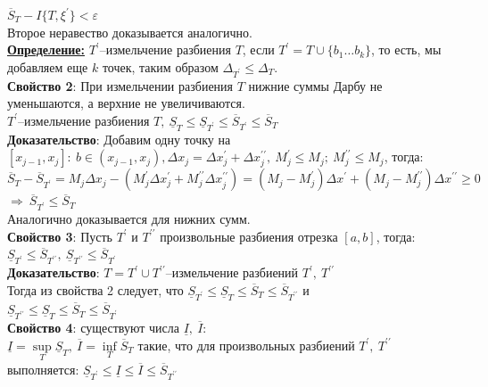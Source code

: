 \documentclass[a4paper,12pt]{article} %
\renewcommand {\geq}{\geqslant}
\renewcommand {\leq}{\leqslant}
\begin{document}
	$\overline{S}_T - I\{T,\xi^{\prime}\}<\varepsilon$ \\
	Второе неравество доказывается аналогично.\\
	
	\underline{\textbf{Определение:}} $T^{\prime}$--измельчение разбиения $T$, если $T^{\prime}=T\cup \{b_1{\dots}b_k\}$, то есть, мы добавляем еще $k$ точек, таким образом $\Delta_{T^{\prime}}\leq \Delta_T$.\\
	
	\textbf{Свойство 2}: При измельчении разбиения $T$ нижние суммы Дарбу не уменьшаются, а верхние не увеличиваются.\\
	$T^{\prime}$--измельчение разбиения $T,~\underline{S}_T\leq \underline{S}_{T^{\prime}}\leq \overline{S}_{T^{\prime}}\leq \overline{S}_T$\\
	
	\textbf{Доказательство}: Добавим одну точку на $[x_{j-1},x_j]:~b\in (x_{j-1},x_j), \Delta x_j = \Delta x^{\prime}_j +\Delta x^{\prime\prime}_j,~M^{\prime}_j\leq M_j;~M^{\prime\prime}_j\leq M_j$, тогда:\\
	$$\overline{S}_T-\overline{S}_{T^{\prime}}=M_j\Delta x_j-(M^{\prime}_j\Delta x^{\prime}_j+M^{\prime\prime}_j\Delta x^{\prime\prime}_j)=(M_j-M^{\prime}_j)\Delta x^{\prime}+(M_j-M^{\prime\prime}_j)\Delta x^{\prime\prime}\geq0$$
	$\Rightarrow~\overline{S}_{T^{\prime}}\leq \overline{S}_T$\\
	Аналогично доказывается для нижних сумм.\\
	
	\textbf{Свойство 3}: Пусть $T^{\prime}$ и $T^{\prime\prime}$ произвольные разбиения отрезка $[a,b]$, тогда:
	$\underline{S}_{T^{\prime}}\leq \overline{S}_{T^{\prime\prime}},~\underline{S}_{T^{\prime\prime}}\leq \overline{S}_{T^{\prime}}$\\
	
	\textbf{Доказательство}: $T = T^{\prime}\cup T^{\prime\prime}$--измельчение разбиений $T^{\prime},~ T^{\prime\prime}$\\
	Тогда из свойства 2 следует, что $\underline{S}_{T^{\prime}}\leq \underline{S}_T\leq \overline{S}_T\leq \overline{S}_{T^{\prime\prime}}$ и\\
	$\underline{S}_{T^{\prime\prime}}\leq \underline{S}_T\leq \overline{S}_T\leq \overline{S}_{T^{\prime}}$\\
	
	
	\textbf{Свойство 4}: существуют числа $\underline{I},~\overline{I}$:\\
	$\underline{I}=\sup\limits_{T}{\underline{S}_T,~\overline{I}=\inf\limits_{T}{\overline{S}_T}}$ такие, что для произвольных разбиений $T^{\prime},~T^{\prime\prime}$ выполняется: 
	$\underline{S}_{T^{\prime}}\leq \underline{I}\leq \overline{I}\leq \overline{S}_{T^{\prime\prime}}$
	
\end{document}
